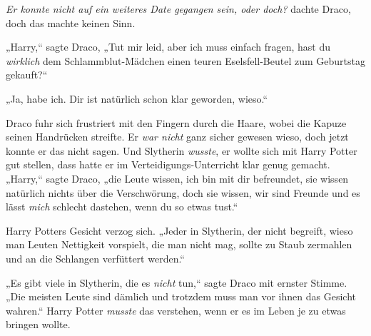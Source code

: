 \emph{Er konnte nicht auf ein weiteres Date gegangen sein, oder doch?} dachte Draco, doch das machte keinen Sinn.

„Harry,“ sagte Draco, „Tut mir leid, aber ich muss einfach fragen, hast du \emph{wirklich} dem Schlammblut-Mädchen einen teuren Eselsfell-Beutel zum Geburtstag gekauft?“

„Ja, habe ich. Dir ist natürlich schon klar geworden, wieso.“

Draco fuhr sich frustriert mit den Fingern durch die Haare, wobei die Kapuze seinen Handrücken streifte. Er \emph{war nicht} ganz sicher gewesen wieso, doch jetzt konnte er das nicht sagen. Und Slytherin \emph{wusste}, er wollte sich mit Harry Potter gut stellen, dass hatte er im Verteidigungs-Unterricht klar genug gemacht. „Harry,“ sagte Draco, „die Leute wissen, ich bin mit dir befreundet, sie wissen natürlich nichts über die Verschwörung, doch sie wissen, wir sind Freunde und es lässt \emph{mich} schlecht dastehen, wenn du so etwas tust.“

Harry Potters Gesicht verzog sich. „Jeder in Slytherin, der nicht begreift, wieso man Leuten Nettigkeit vorspielt, die man nicht mag, sollte zu Staub zermahlen und an die Schlangen verfüttert werden.“

„Es gibt viele in Slytherin, die es \emph{nicht} tun,“ sagte Draco mit ernster Stimme. „Die meisten Leute sind dämlich und trotzdem muss man vor ihnen das Gesicht wahren.“ Harry Potter \emph{musste} das verstehen, wenn er es im Leben je zu etwas bringen wollte.


